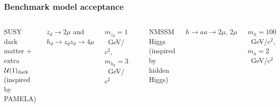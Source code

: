 \documentclass[compress]{beamer}
\newcommand{\s}[1]{{\mbox{\scriptsize #1}}}
\begin{document}
\begin{frame}
\frametitle{Benchmark model acceptance}

\vspace{0.5 cm}
\begin{columns}
\centering SUSY dark matter + extra $\mathcal{U}(1)_\s{dark}$ (inspired by PAMELA)

\vspace{0.1 cm}
$z_d \to 2\mu$ and $h_d \to z_dz_d \to 4\mu$

\vspace{0.1 cm}
$m_{z_d} = 1$~GeV/$c^2$, $m_{h_d} = 3$~GeV/$c^2$

\vspace{0.1 cm}
\includegraphics[width=0.6\linewidth]{chart2d_u1.png}

\centering NMSSM Higgs \\
(inspired by hidden Higgs)

\vspace{0.1 cm}
$h \to aa \to 2\mu, \, 2\mu$

\vspace{0.1 cm}
$m_h = 100$~GeV/$c^2$, $m_a = 2$~GeV/$c^2$

\vspace{0.1 cm}
\includegraphics[width=0.6\linewidth]{chart2d_NMSSM.png}
\end{columns}


\end{frame}
\end{document}
